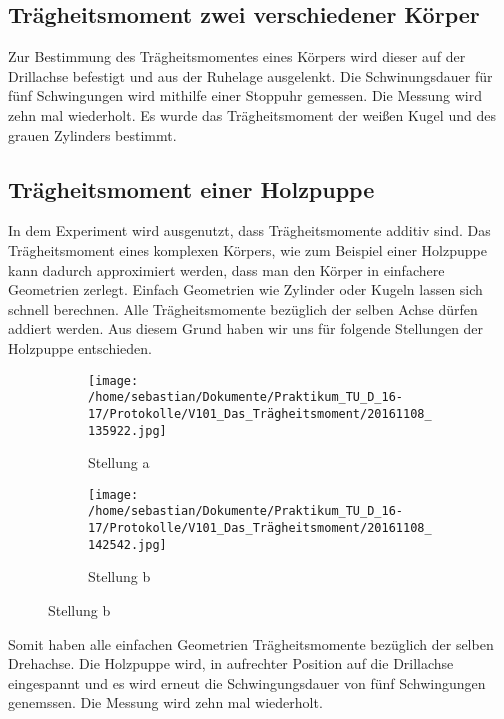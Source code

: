 \documentclass[parskip=half, bibliography=totoc]{scrartcl}
\begin{document}
\subsection{Trägheitsmoment zwei verschiedener Körper}
Zur Bestimmung des Trägheitsmomentes eines Körpers wird dieser auf der Drillachse befestigt und aus der Ruhelage ausgelenkt. Die Schwinungsdauer für fünf Schwingungen wird mithilfe einer Stoppuhr gemessen. Die Messung wird zehn mal wiederholt.
Es wurde das Trägheitsmoment der weißen Kugel und des grauen Zylinders bestimmt.
\subsection{Trägheitsmoment einer Holzpuppe}
In dem Experiment wird ausgenutzt, dass Trägheitsmomente additiv sind. Das Trägheitsmoment eines komplexen Körpers, wie zum Beispiel einer Holzpuppe kann dadurch approximiert werden, dass man den Körper in einfachere Geometrien zerlegt. Einfach Geometrien wie Zylinder oder Kugeln lassen sich schnell berechnen. Alle Trägheitsmomente bezüglich der selben Achse dürfen addiert werden.
Aus diesem Grund haben wir uns für folgende Stellungen der Holzpuppe entschieden.

\begin{figure}
  \centering
  \begin{subfigure}{0.48\textwidth}
    \centering
    \texttt{[image: /home/sebastian/Dokumente/Praktikum\_TU\_D\_16-17/Protokolle/V101\_Das\_Trägheitsmoment/20161108\_135922.jpg]}
    \caption{Stellung a}
    \label{fig:stellunga}
  \end{subfigure}
  \begin{subfigure}{0.48\textwidth}
    \centering
    \texttt{[image: /home/sebastian/Dokumente/Praktikum\_TU\_D\_16-17/Protokolle/V101\_Das\_Trägheitsmoment/20161108\_142542.jpg]}
    \caption{Stellung b}
    \label{fig:stellunb}
  \end{subfigure}
  \label{fig:Holzpuppe}
\end{figure}

Somit haben alle einfachen Geometrien Trägheitsmomente bezüglich der selben Drehachse. Die Holzpuppe wird, in aufrechter Position auf die Drillachse eingespannt und es wird erneut die Schwingungsdauer von fünf Schwingungen genemssen. Die Messung wird zehn mal wiederholt.
\newpage
\printbibliography
\end{document}
